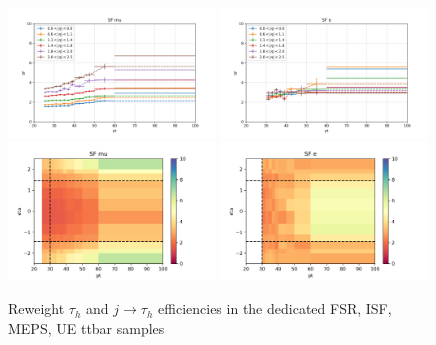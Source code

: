 \begin{figure}
    \centering
    \includegraphics[width=0.49\textwidth]{chapters/Appendix/sectionQCD/figures/123j1b/SF_mu_1d.png}
    \includegraphics[width=0.49\textwidth]{chapters/Appendix/sectionQCD/figures/123j1b/SF_e_1d.png}
    \includegraphics[width=0.49\textwidth]{chapters/Appendix/sectionQCD/figures/123j1b/SF_mu_2d.png}
    \includegraphics[width=0.49\textwidth]{chapters/Appendix/sectionQCD/figures/123j1b/SF_e_2d.png}

    \caption{Reweight $\tau_h$ and $j \to \tau_h$ efficiencies in the dedicated FSR, ISF, MEPS, UE ttbar samples}
    \label{fig:appendix:123j1b}
\end{figure}



